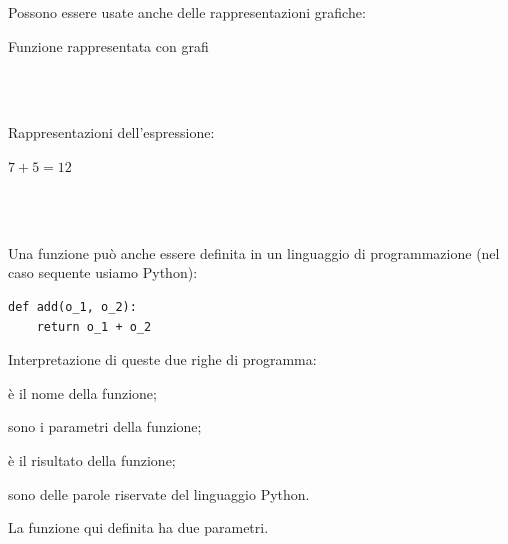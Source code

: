 \pagebreak
Possono essere usate anche delle rappresentazioni grafiche:

\vspace{1em}
\begin{minipage}[t]{.48\textwidth}
\begin{center}
Funzione rappresentata con grafi\\[1em]
\begin{inaccessibleblock}
\\[0.5em]
\\[2em]
\end{inaccessibleblock}

\begin{inaccessibleblock}
\end{inaccessibleblock}
\end{center}
\end{minipage}
\hfill
\begin{minipage}[t]{.48\textwidth}
\begin{center}
Rappresentazioni dell'espressione:

\(7 + 5 = 12\)

\begin{inaccessibleblock}
\\[0.5em]
\\[2em]
\end{inaccessibleblock}

\begin{inaccessibleblock}
\end{inaccessibleblock}
\end{center}
\end{minipage}
\vspace{1em}

Una funzione può anche essere definita in un linguaggio di programmazione 
(nel caso sequente usiamo Python):
\begin{lstlisting}
def add(o_1, o_2):
    return o_1 + o_2
\end{lstlisting}
Interpretazione di queste due righe di programma:
\begin{description} [noitemsep]
\item [\textbf{``add''}] è il nome della funzione;
\item [\textbf{``o\_1'' e ``o\_2''}] sono i parametri della funzione; 
\item [\textbf{l'espressione che segue la parola ``return''}] è il risultato
della funzione; 
\item [\textbf{``def'' e ``return''}] sono delle parole riservate del 
linguaggio
Python.
\end{description}
La funzione qui definita ha due parametri.

